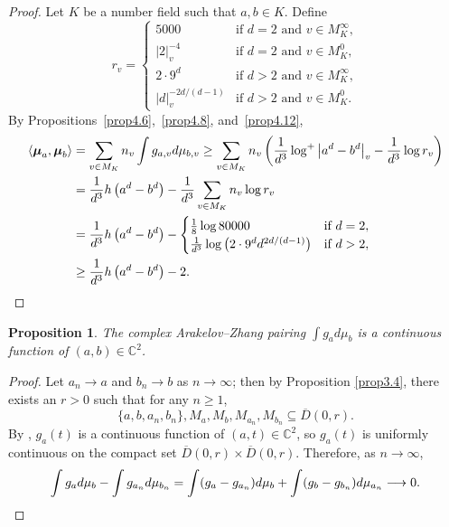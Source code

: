 \documentclass[11pt]{amsart}
\numberwithin{equation}{section}
\theoremstyle{plain}
\newtheorem{prop}[thm]{Proposition}
\theoremstyle{definition}
\theoremstyle{remark}
\newcommand{\C}{\mathbb C}
\begin{document}
\begin{proof}
Let $K$ be a number field such that $a,b\in K$. Define
\[
r_{v}=\begin{cases}
5000 & \text{if }d=2\text{ and }v\in M_{K}^{\infty},\\
|2|_{v}^{-4} & \text{if }d=2\text{ and }v\in M_{K}^{0},\\
2\cdot9^{d} & \text{if }d>2\text{ and }v\in M_{K}^{\infty},\\
|d|_{v}^{-2d/(d-1)} & \text{if }d>2\text{ and }v\in M_{K}^{0}.
\end{cases}
\]
By Propositions~\ref{prop4.6},~\ref{prop4.8}, and~\ref{prop4.12},
\allowdisplaybreaks
\begin{align*}
\left\langle \boldsymbol{\mu}_{a},\boldsymbol{\mu}_{b}\right\rangle  & =\sum_{v\in M_{K}}n_{v}\int g_{a,v}d\mu_{b,v}\geq\sum_{v\in M_{K}}n_{v}\left(\frac{1}{d^{3}}\log^{+}\left|a^{d}-b^{d}\right|_{v}-\frac{1}{d^{3}}\log r_{v}\right)\\
 & =\frac{1}{d^{3}}h\left(a^{d}-b^{d}\right)-\frac{1}{d^{3}}\sum_{v\in M_{K}}n_{v}\log r_{v}\\
& =\frac{1}{d^{3}}h\left(a^{d}-b^{d}\right)-
\begin{cases}
\frac{1}{8}\log80000 & \text{if }d=2,\\
\frac{1}{d^{3}}\log\left(2\cdot9^{d}d^{2d/(d-1)}\right) & \text{if }d>2,
\end{cases}\\
 & \geq\frac{1}{d^{3}}h\left(a^{d}-b^{d}\right)-2.\qedhere
\end{align*}
\end{proof}

\begin{prop}\label{prop4.14}
The complex Arakelov--Zhang pairing $\int g_{a}d\mu_{b}$
is a continuous function of $(a,b)\in\C^{2}$.
\end{prop}

\begin{proof}
Let $a_{n}\to a$ and $b_{n}\to b$ as $n\to\infty$; then by Proposition
\ref{prop3.4}, there exists an $r>0$ such that for any $n\geq1$,
\[
\{a,b,a_{n},b_{n}\},M_{a},M_{b},M_{a_{n}},M_{b_{n}}\subseteq\overline{D}(0,r).
\]
By \cite[Proposition 1.2]{BH}, $g_{a}(t)$ is a continuous function
of $(a,t)\in\C^{2}$, so $g_{a}(t)$ is uniformly continuous
on the compact set $\overline{D}(0,r)\times\overline{D}(0,r)$. Therefore,
as $n\to\infty$,
\[
\int g_{a}d\mu_{b}-\int g_{a_{n}}d\mu_{b_{n}}=\int(g_{a}-g_{a_{n}})d\mu_{b}+\int(g_{b}-g_{b_{n}})d\mu_{a_{n}}\longrightarrow 0.\qedhere
\]
\end{proof}
\end{document}
